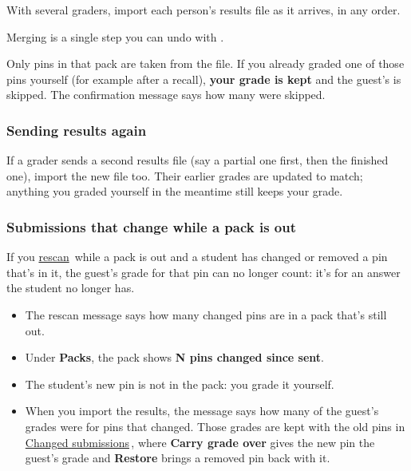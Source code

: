 With several graders, import each person's results file as it arrives, in any order.

Merging is a single step you can undo with \keycap{\cmdsym{}}\keyplus{}.

Only pins in that pack are taken from the file. If you already graded one of those pins yourself (for example after a recall), \textbf{your grade is kept} and the guest's is skipped. The confirmation message says how many were skipped.

\subsubsection{Sending results again}\label{sec:handoff:sending-results-again}

If a grader sends a second results file (say a partial one first, then the finished one), import the new file too. Their earlier grades are updated to match; anything you graded yourself in the meantime still keeps your grade.

\subsubsection{Submissions that change while a pack is out}\label{sec:handoff:submissions-that-change-while-a-pack-is-out}

If you \href{https://github.com/agadin/micro-speed-grader/blob/main/docs/help/getting-started.md\#new-and-changed-submissions}{rescan}\,\onlinemark{} while a pack is out and a student has changed or removed a pin that's in it, the guest's grade for that pin can no longer count: it's for an answer the student no longer has.

\begin{itemize}[topsep=2pt, itemsep=2pt]
\item The rescan message says how many changed pins are in a pack that's still out.
\item Under \textbf{Packs}, the pack shows \textbf{N pins changed since sent}.
\item The student's new pin is not in the pack: you grade it yourself.
\item When you import the results, the message says how many of the guest's grades were for pins that changed. Those grades are kept with the old pins in \href{https://github.com/agadin/micro-speed-grader/blob/main/docs/help/getting-started.md\#review-changed-submissions}{Changed submissions}\,\onlinemark{}, where \textbf{Carry grade over} gives the new pin the guest's grade and \textbf{Restore} brings a removed pin back with it.
\end{itemize}

